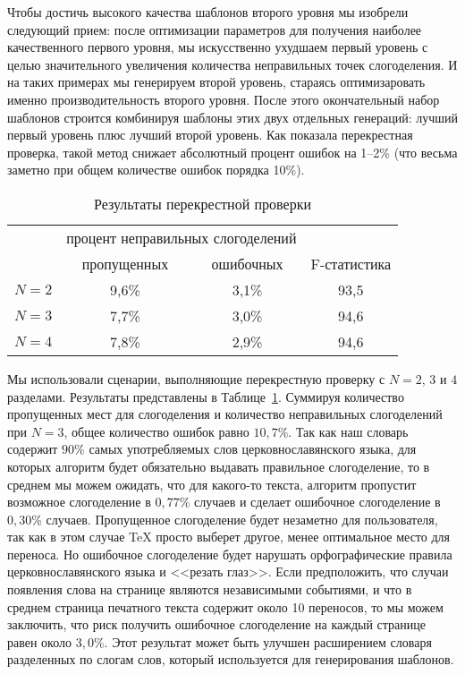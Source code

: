 \documentclass[12pt,a4paper,oneside]{extarticle}
\begin{document}
Чтобы достичь высокого качества шаблонов второго уровня мы изобрели следующий прием: после оптимизации параметров для получения наиболее качественного первого уровня, мы искусственно ухудшаем первый уровень с целью значительного увеличения количества неправильных точек слогоделения. И на таких примерах мы генерируем второй уровень, стараясь оптимизаровать именно производительность второго уровня. После этого окончательный набор шаблонов строится комбинируя шаблоны этих двух отдельных генераций: лучший первый уровень плюс лучший второй уровень. Как показала перекрестная проверка, такой метод снижает абсолютный процент ошибок на 1--2\% (что весьма заметно при общем количестве ошибок порядка 10\%).

\begin{table}[ht]
\centering
\caption{Результаты перекрестной проверки \label{validation_results}}
\begin{tabular}{cccc}
		&	\multicolumn{2}{c}{процент неправильных слогоделений} & \\
		&	пропущенных		& ошибочных	& F-статистика \\
\hline
$N = 2$	& 	9,6\%			& 	3,1\% 	&	93,5 \\
$N = 3$ 	& 	7,7\%			& 	3,0\% 	& 	94,6	\\
$N = 4$ 	&	7,8\%			& 	2,9\% 	& 	94,6	\\
\hline
\end{tabular}
\end{table}

Мы использовали сценарии, выполняющие перекрестную проверку с $N = 2$, $3$ и $4$ разделами. Результаты представлены в Таблице~\ref{validation_results}. Суммируя количество пропущенных мест для слогоделения и количество неправильных слогоделений при  $N = 3$, общее количество ошибок равно $10,7\%$.  Так как наш словарь содержит $90\%$ самых употребляемых слов церковнославянского языка, для которых алгоритм будет обязательно выдавать правильное слогоделение, то в среднем мы можем ожидать, что для какого-то текста, алгоритм пропустит возможное слогоделение в $0,77\%$  случаев и сделает ошибочное слогоделение в $0,30\%$ случаев. Пропущенное слогоделение будет незаметно для пользователя, так как в этом случае \TeX{} просто выберет другое, менее оптимальное место для переноса. Но ошибочное слогоделение будет нарушать орфографические правила церковнославянского языка и <<резать глаз>>. Если предположить, что случаи появления слова на странице являются независимыми событиями, и что в среднем страница печатного текста содержит около 10 переносов, то мы можем заключить, что риск получить ошибочное слогоделение на каждый странице равен около $3,0\%$. Этот результат может быть улучшен расширением словаря разделенных по слогам слов, который используется для генерирования шаблонов.
\end{document}
